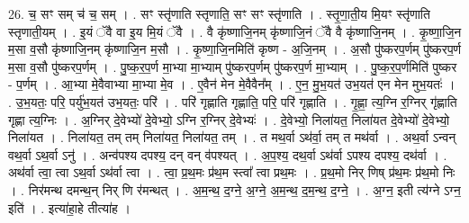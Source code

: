 \documentclass[17pt]{extarticle}
\begin{document}
26. च॒ सꣳ सम् च॑ च॒ सम् । . सꣳ स्तृ॑णाति स्तृणाति॒ सꣳ सꣳ स्तृ॑णाति । . स्तृ॒णा॒ती॒य मि॒यꣳ स्तृ॑णाति स्तृणाती॒यम् । . इ॒यं ॅवै वा इ॒य मि॒यं ॅवै । . वै कृ॑ष्णाजि॒नम् कृ॑ष्णाजि॒नं ॅवै वै कृ॑ष्णाजि॒नम् । . कृ॒ष्णा॒जि॒न म॒सा व॒सौ कृ॑ष्णाजि॒नम् कृ॑ष्णाजि॒न म॒सौ । . कृ॒ष्णा॒जि॒नमिति॑ कृष्ण - अ॒जि॒नम् । . अ॒सौ पु॑ष्करप॒र्णम् पु॑ष्करप॒र्ण म॒सा व॒सौ पु॑ष्करप॒र्णम् । . पु॒ष्क॒र॒प॒र्ण मा॒भ्या मा॒भ्याम् पु॑ष्करप॒र्णम् पु॑ष्करप॒र्ण मा॒भ्याम् । . पु॒ष्क॒र॒प॒र्णमिति॑ पुष्कर - प॒र्णम् । . आ॒भ्या मे॒वैवाभ्या मा॒भ्या मे॒व । . ए॒वैन॑ मेन मे॒वैवैन᳚म् । . ए॒न॒ मु॒भ॒यत॑ उभ॒यत॑ एन मेन मुभ॒यतः॑ । . उ॒भ॒यतः॒ परि॒ पर्यु॑भ॒यत॑ उभ॒यतः॒ परि॑ । . परि॑ गृह्णाति गृह्णाति॒ परि॒ परि॑ गृह्णाति । . गृ॒ह्णा॒ त्य॒ग्नि र॒ग्निर् गृ॑ह्णाति गृह्णा त्य॒ग्निः । . अ॒ग्निर् दे॒वेभ्यो॑ दे॒वेभ्यो॒ ऽग्नि र॒ग्निर् दे॒वेभ्यः॑ । . दे॒वेभ्यो॒ निला॑यत॒ निला॑यत दे॒वेभ्यो॑ दे॒वेभ्यो॒ निला॑यत । . निला॑यत॒ तम् तम् निला॑यत॒ निला॑यत॒ तम् । . त मथ॒र्वा ऽथ॑र्वा॒ तम् त मथ॑र्वा । . अथ॒र्वा ऽन्वन् वथ॒र्वा ऽथ॒र्वा ऽनु॑ । . अन्व॑पश्य दपश्य॒ दन् वन् व॑पश्यत् । . अ॒प॒श्य॒ दथ॒र्वा ऽथ॑र्वा ऽपश्य दपश्य॒ दथ॑र्वा । . अथ॑र्वा त्वा॒ त्वा ऽथ॒र्वा ऽथ॑र्वा त्वा । . त्वा॒ प्र॒थ॒मः प्र॑थ॒म स्त्वा᳚ त्वा प्रथ॒मः । . प्र॒थ॒मो निर् णिष् प्र॑थ॒मः प्र॑थ॒मो निः । . निर॑मन्थ दमन्थ॒न् निर् णि र॑मन्थत् । . अ॒म॒न्थ॒ द॒ग्ने॒ अ॒ग्ने॒ अ॒म॒न्थ॒ द॒म॒न्थ॒ द॒ग्ने॒ । . अ॒ग्न॒ इती त्य॑ग्ने ऽग्न॒ इति॑ । . इत्या॑हा॒हे तीत्या॑ह । \newline
\end{document}
